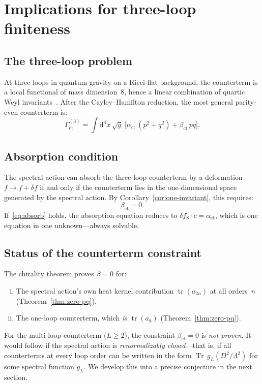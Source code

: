 \documentclass[12pt,a4paper]{article}
\theoremstyle{definition}
\theoremstyle{remark}
\newcommand{\dd}{\mathrm{d}}
\newcommand{\Tr}{\operatorname{Tr}}
\newcommand{\tr}{\operatorname{tr}}
\newcommand{\Lam}{\Lambda}
\begin{document}
\section{Implications for three-loop finiteness}
\label{sec:threeloop}

\subsection{The three-loop problem}

At three loops in quantum gravity on a Ricci-flat background, the
counterterm is a local functional of mass dimension~8, hence a linear
combination of quartic Weyl
invariants~\cite{Goroff:1985th,Stelle:1976gc,vandeVen:1992gw}.  After
the Cayley--Hamilton reduction, the most general parity-even counterterm is:
\begin{equation}\label{eq:ct}
  \Gamma_{\mathrm{ct}}^{(3)} = \int \dd^4x\,\sqrt{g}\;
  \bigl[\alpha_{\mathrm{ct}}\,(p^2 + q^2) + \beta_{\mathrm{ct}}\,pq\bigr].
\end{equation}

\subsection{Absorption condition}

The spectral action can absorb the three-loop counterterm by a deformation
$f \to f + \delta f$ if and only if the counterterm lies in the
one-dimensional space generated by the spectral action.  By
Corollary~\ref{cor:one-invariant}, this requires:
\begin{equation}\label{eq:absorb}
  \beta_{\mathrm{ct}} = 0.
\end{equation}
If~\eqref{eq:absorb} holds, the absorption equation reduces to
$\delta f_8 \cdot c = \alpha_{\mathrm{ct}}$, which is one equation in one
unknown---always solvable.

\subsection{Status of the counterterm constraint}

The chirality theorem proves $\beta = 0$ for:
\begin{enumerate}[(i)]
  \item The spectral action's own heat kernel contribution
    $\tr(a_{2n})$ at all orders~$n$ (Theorem~\ref{thm:zero-pq}).
  \item The one-loop counterterm, which \emph{is} $\tr(a_8)$
    (Theorem~\ref{thm:zero-pq}).
\end{enumerate}
For the multi-loop counterterm ($L \geq 2$), the constraint $\beta_{\mathrm{ct}} = 0$
is \emph{not proven}.  It would follow if the spectral action is
\emph{renormalizably closed}---that is, if all counterterms at every loop order
can be written in the form $\Tr\,g_L(D^2/\Lam^2)$ for some spectral
function $g_L$.  We develop this into a precise conjecture in the next section.
\end{document}
